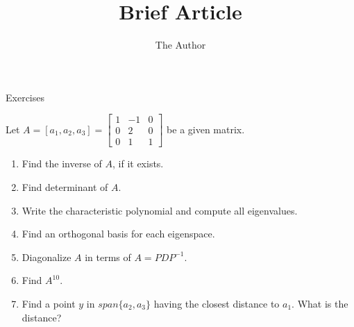 \documentclass[11pt]{amsart}
\title{Brief Article}
\author{The Author}
\begin{document}



\begin{center}
Exercises
\end{center}
\vspace{.2in}
Let 
$A = [a_1, a_2, a_3] = 
\begin{bmatrix}
1 & -1 & 0\\
0 & 2 & 0\\
0 & 1 & 1 
\end{bmatrix}
$
be a given matrix.

\vspace{.2in}


\begin{enumerate}


\item Find the inverse of $A$, if it exists.
\item Find determinant of $A$. 
\item Write the characteristic polynomial and compute all eigenvalues.

\item Find an orthogonal basis for each eigenspace.
\item  Diagonalize $A$ in terms of $A = P D P^{-1}.$
\item Find $A^{10}$.
\item Find a point $y$ in $span\{a_2, a_3\}$ having the closest distance to $a_1$. What is the distance?



\end{enumerate}
\end{document}
